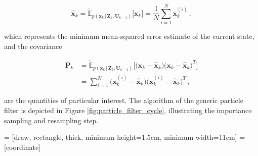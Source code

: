 \begin{equation}\label{eq:empirical_mean}
  \hat{\bm{x}}_k = \tilde{\mathbb{E}}_{p(\bm{x}_k\,|\,\bm{Z}_{k}, \bm{U}_{k-1})}\big[\bm{x}_k\big] = \frac{1}{N} \sum^N_{i = 1} \bm{x}^{(i)}_k \,,
\end{equation}

\noindent
which represents the minimum mean-squared error estimate of the current state, and the covariance

\begin{equation}\label{eq:empirical_cov}
\begin{split}
  \bm{P}_k &= \tilde{\mathbb{E}}_{p(\bm{x}_k\,|\,\bm{Z}_{k}, \bm{U}_{k-1})}\Big[\big(\bm{x}_k - \hat{\bm{x}}_{k}\big) \big(\bm{x}_k - \hat{\bm{x}}_{k}\big)^T\Big] \\
  &= \sum^N_{i = 1} \big(\bm{x}^{(i)}_k - \hat{\bm{x}}_{k}\big) \big(\bm{x}^{(i)}_k - \hat{\bm{x}}_{k}\big)^T \,,
\end{split}
\end{equation}


\noindent
are the quantities of particular interest. The algorithm of the generic particle filter is depicted in Figure \ref{fig:particle_filter_cycle}, illustrating the importance sampling and resampling step.

 = [draw, rectangle, thick, 
    minimum height=1.5cm, minimum width=11cm]
 = [coordinate]

